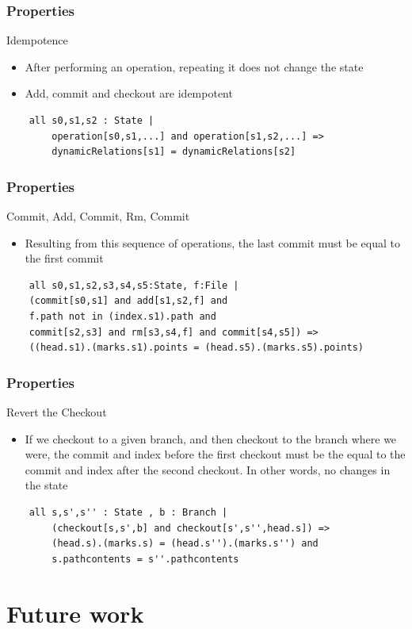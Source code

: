\documentclass{beamer}
\begin{document}
\begin{frame}[fragile]
   \frametitle{Properties}
   \begin{block}{Idempotence}
      \begin{itemize}
         \item After performing an operation, repeating it does not change the state
         \item Add, commit and checkout are idempotent
      \end{itemize}
   \end{block}
   \scriptsize
   \begin{lstlisting}
	all s0,s1,s2 : State | 
		operation[s0,s1,...] and operation[s1,s2,...] => 
		dynamicRelations[s1] = dynamicRelations[s2]
   \end{lstlisting}
\end{frame}

\begin{frame}[fragile]
	\frametitle{Properties}
	\begin{block}{Commit, Add, Commit, Rm, Commit}
	\begin{itemize}
		\item Resulting from this sequence of operations, the last
		commit must be equal to the first commit
	\end{itemize}
	\end{block}
	\scriptsize
	\begin{lstlisting}
	all s0,s1,s2,s3,s4,s5:State, f:File |	
	(commit[s0,s1] and add[s1,s2,f] and 
	f.path not in (index.s1).path and
	commit[s2,s3] and rm[s3,s4,f] and commit[s4,s5]) => 
	((head.s1).(marks.s1).points = (head.s5).(marks.s5).points)
	\end{lstlisting}
	\normalsize
\end{frame}

\begin{frame}[fragile]
	\frametitle{Properties}
	\begin{block}{Revert the Checkout}
	\begin{itemize}
		\item If we checkout to a given branch, and then checkout to the
		branch where we were, the commit and index before the first checkout must
		be the equal to the commit and index after the second checkout. In other
		words, no changes in the state
	\end{itemize}
	\end{block}
	\scriptsize
	\begin{lstlisting}
	all s,s',s'' : State , b : Branch | 
		(checkout[s,s',b] and checkout[s',s'',head.s]) => 
		(head.s).(marks.s) = (head.s'').(marks.s'') and
		s.pathcontents = s''.pathcontents
	\end{lstlisting}
	\normalsize
\end{frame}

\section{Future work}

\frame{
   \titlepage
}
\end{document}
